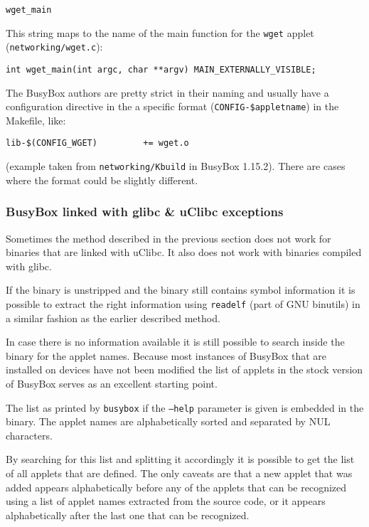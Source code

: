 \documentclass[10pt,a4paper]{article}
\begin{document}
\begin{verbatim}
wget_main
\end{verbatim}

This string maps to the name of the main function for the \texttt{wget} applet
(\texttt{networking/wget.c}):

\begin{verbatim}
int wget_main(int argc, char **argv) MAIN_EXTERNALLY_VISIBLE;
\end{verbatim}

The BusyBox authors are pretty strict in their naming and usually have a
configuration directive in the a specific format
(\texttt{CONFIG-\$appletname}) in the Makefile, like:

\begin{verbatim}
lib-$(CONFIG_WGET)         += wget.o
\end{verbatim}

(example taken from \texttt{networking/Kbuild} in BusyBox 1.15.2). There are
cases where the format could be slightly different.

\subsubsection{BusyBox linked with glibc \& uClibc exceptions}

Sometimes the method described in the previous section does not work for
binaries that are linked with uClibc. It also does not work with binaries
compiled with glibc.

If the binary is unstripped and the binary still contains symbol information
it is possible to extract the right information using \texttt{readelf} (part
of GNU binutils) in a similar fashion as the earlier described method.

In case there is no information available it is still possible to search inside
the binary for the applet names. Because most instances of BusyBox that are
installed on devices have not been modified the list of applets in the stock
version of BusyBox serves as an excellent starting point.

The list as printed by \texttt{busybox} if the \texttt{--help} parameter is
given is embedded in the binary. The applet names are alphabetically sorted
and separated by NUL characters.

By searching for this list and splitting it accordingly it is possible to get
the list of all applets that are defined. The only caveats are that a new
applet that was added appears alphabetically before any of the applets that
can be recognized using a list of applet names extracted from the source code,
or it appears alphabetically after the last one that can be recognized.
\end{document}
